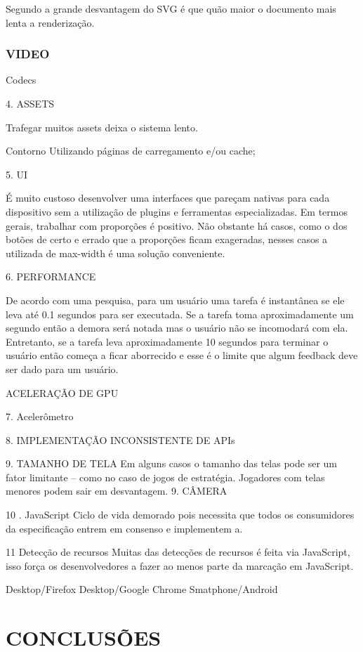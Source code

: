 \documentclass[
12pt,
a4paper,
portuges,
draft
]{report}
\begin{document}
Segundo \cite{html5mostwanted} a grande desvantagem do SVG é que quão maior o documento mais lenta a renderização.

\subsection{VIDEO}

Codecs

4. ASSETS

Trafegar muitos assets deixa o sistema lento.

 Contorno
Utilizando páginas de carregamento e/ou cache;

5. UI

É muito custoso desenvolver uma interfaces que pareçam nativas
para cada dispositivo sem a utilização de plugins e ferramentas
especializadas. Em termos gerais, trabalhar com proporções é
positivo. Não obstante
há casos, como o dos botões de certo e errado que a proporções ficam
exageradas, nesses casos a utilizada de max-width é uma solução
conveniente.

6. PERFORMANCE

De acordo com uma pesquisa, para um usuário uma tarefa é instantânea
se ele leva até 0.1 segundos para ser executada. Se a tarefa toma
aproximadamente um segundo então a demora será notada mas o
usuário não se incomodará com ela. Entretanto, se a tarefa leva
aproximadamente 10 segundos para terminar o usuário então começa a
ficar aborrecido e esse é o limite que algum feedback deve ser dado
para um usuário.

ACELERAÇÃO DE GPU

7. Acelerômetro

8. IMPLEMENTAÇÃO INCONSISTENTE DE APIs

9.  TAMANHO DE TELA
Em alguns casos o tamanho das telas pode ser um fator limitante – como
no caso de jogos de estratégia. Jogadores com telas menores podem sair
em desvantagem. 9. CÂMERA

10 . JavaScript
Ciclo de vida demorado pois necessita que todos os consumidores da
especificação entrem em consenso e implementem a.

11  Detecção de recursos
Muitas das detecções de recursos é feita via JavaScript, isso força os desenvolvedores a fazer ao menos parte da marcação em JavaScript\autocite{diveIntohtml}.

Desktop/Firefox
Desktop/Google Chrome
Smatphone/Android
\chapter{CONCLUSÕES}
\thispagestyle{myheadings}
\end{document}

